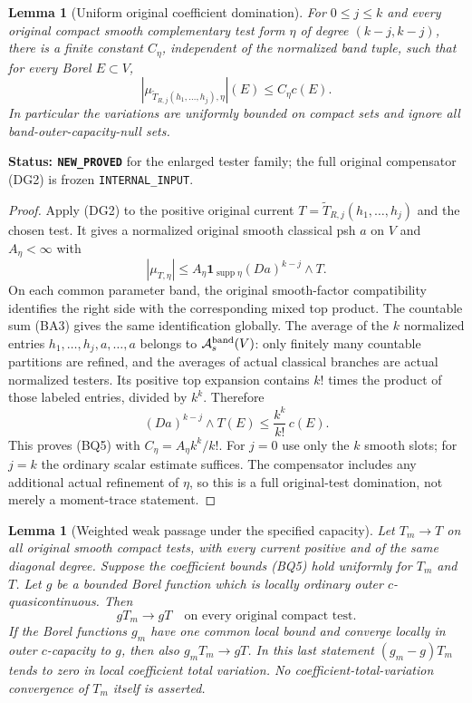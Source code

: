 \documentclass[11pt,a4paper]{article}
\numberwithin{equation}{section}
\newtheorem{lemma}[theorem]{Lemma}
\theoremstyle{definition}
\theoremstyle{remark}
\begin{document}
\begin{lemma}[Uniform original coefficient domination]
\label{lem:r12-band-capacity-coefficients}
For $0\leq j\leq k$ and every original compact smooth
complementary test form $\eta$ of degree $(k-j,k-j)$, there is
a finite constant $C_\eta$, independent of the normalized band
tuple, such that for every Borel $E\subset V$,
\[
 \left|\mu_{\widetilde T_{R,j}(h_1,\ldots,h_j),\eta}\right|(E)
                              \leq C_\eta c(E).
 \tag{BQ5}
\]
In particular the variations are uniformly bounded on compact
sets and ignore all band-outer-capacity-null sets.
\end{lemma}

\noindent\textbf{Status: \texttt{NEW\_PROVED}} for the enlarged
tester family; the full original compensator (DG2) is frozen
\texttt{INTERNAL\_INPUT}.

\begin{proof}
Apply (DG2) to the positive original current
$T=\widetilde T_{R,j}(h_1,\ldots,h_j)$ and the chosen test.
It gives a normalized original smooth classical psh $a$ on $V$
and $A_\eta<\infty$ with
\[
                  |\mu_{T,\eta}|
                        \leq A_\eta\mathbf1_{\operatorname{supp}\eta}
                                                (Da)^{k-j}\wedge T.
\]
On each common parameter band, the original smooth-factor
compatibility identifies the right side with the corresponding
mixed top product. The countable sum (BA3) gives the same
identification globally. The average of the $k$ normalized
entries $h_1,\ldots,h_j,a,\ldots,a$ belongs to
$\mathcal A_s^{\rm band}(V)$: only finitely many countable
partitions are refined, and the averages of actual classical
branches are actual normalized testers. Its positive top
expansion contains $k!$ times the product of those labeled
entries, divided by $k^k$. Therefore
\[
               (Da)^{k-j}\wedge T(E)
                         \leq\frac{k^k}{k!}\,c(E).
\]
This proves (BQ5) with $C_\eta=A_\eta k^k/k!$.
For $j=0$ use only the $k$ smooth slots; for $j=k$ the
ordinary scalar estimate suffices. The compensator includes any
additional actual refinement of $\eta$, so this is a full
original-test domination, not merely a moment-trace statement.
\end{proof}

\begin{lemma}[Weighted weak passage under the specified capacity]
\label{lem:r12-band-weighted-weak-passage}
Let $T_m\to T$ on all original smooth compact tests, with
every current positive and of the same diagonal degree. Suppose
the coefficient bounds (BQ5) hold uniformly for $T_m$ and $T$.
Let $g$ be a bounded Borel function which is locally ordinary
outer $c$-quasicontinuous. Then
\[
                              gT_m\longrightarrow gT
                         \quad\text{on every original compact test}.
 \tag{BQ6}
\]
If the Borel functions $g_m$ have one common local bound and
converge locally in outer $c$-capacity to $g$, then also
$g_mT_m\to gT$. In this last statement
$(g_m-g)T_m$ tends to zero in local coefficient total variation.
No coefficient-total-variation convergence of $T_m$ itself is
asserted.
\end{lemma}
\end{document}
